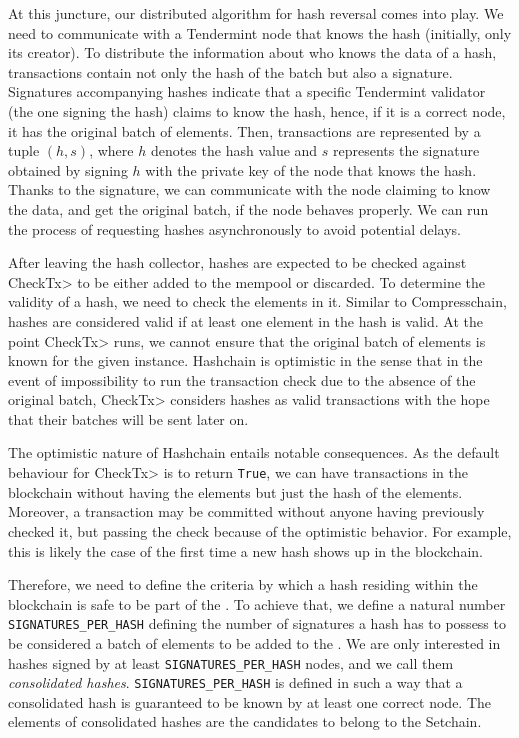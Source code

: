 At this juncture, our distributed algorithm for hash reversal comes into play.
%
We need to communicate with a Tendermint node that knows the hash
(initially, only its creator).
%
To distribute the information about who knows the data of a hash, transactions
contain not only the hash of the batch but also a signature.
%
Signatures accompanying hashes indicate that a specific Tendermint
validator (the one signing the hash) claims to know the hash, hence,
if it is a correct node, it has the original batch of elements.
%
Then, transactions are represented by a tuple $(h, s)$, where $h$ denotes
the hash value and $s$ represents the signature obtained by signing $h$ with
the private key of the node that knows the hash.
%
Thanks to the signature, we can communicate with the node claiming to know the
data, and get the original batch, if the node behaves properly.
%
We can run the process of requesting hashes asynchronously to avoid potential
delays.

%

After leaving the hash collector, hashes are expected to be checked against
\<CheckTx> to be either added to the mempool or discarded.
%
To determine the validity of a hash, we need to check the elements in it.
%
Similar to Compresschain, hashes are considered valid if at least one element
in the hash is valid.
%
At the point \<CheckTx> runs, we cannot ensure that the original batch of
elements is known for the given instance.
%
Hashchain is optimistic in the sense that in the event of impossibility
to run the transaction check due to the absence of the original batch,
\<CheckTx> considers hashes as valid transactions with the hope that
their batches will be sent later on.

%
The optimistic nature of Hashchain entails notable consequences.
%
As the default behaviour for \<CheckTx> is to return \texttt{True},
we can have transactions in the blockchain without having the elements
but just the hash of the elements.
%
Moreover, a transaction may be committed without anyone having
previously checked it, but passing the check because of the optimistic
behavior.
%
For example, this is likely the case of the first time a new hash shows
up in the blockchain.

%

Therefore, we need to define the criteria by which a hash residing within the
blockchain is safe to be part of the \setchain.
%
To achieve that, we define a natural number \texttt{SIGNATURES\_PER\_HASH}
defining the number of signatures a hash has to possess to be considered a batch
of elements to be added to the \setchain.
%
We are only interested in hashes signed by at least
\texttt{SIGNATURES\_PER\_HASH} nodes, and we call them
%
\textit{consolidated hashes}.
%
\texttt{SIGNATURES\_PER\_HASH} is defined in such a way that a consolidated hash
is guaranteed to be known by at least one correct node.
%
The elements of consolidated hashes are the candidates to belong to the
Setchain.

